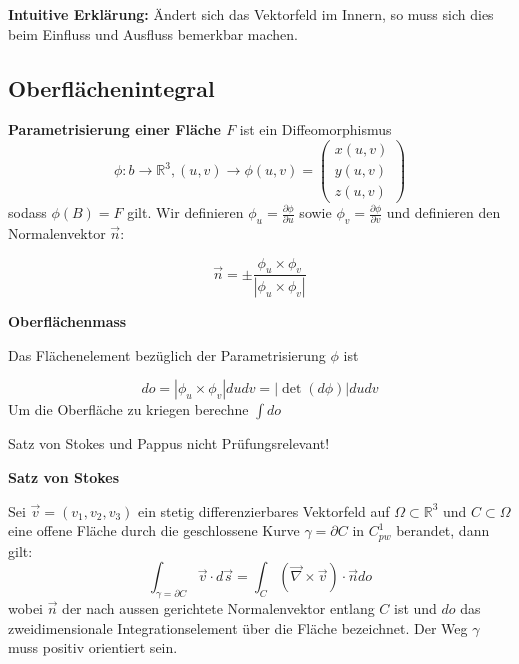\documentclass[25pt]{sciposter}
\newcommand{\R}{\mathbb{R}}
\newenvironment{method}[1]{\begin{mdframed}[backgroundcolor=blue!10,innertopmargin=15pt, innerbottommargin=15pt, nobreak=true]
		\textbf{#1 }
	}
	{ 
	\end{mdframed}
}
\newenvironment{important}{\begin{mdframed}[backgroundcolor=red!50,innertopmargin=15pt, innerbottommargin=15pt, nobreak=true]
		\Large
	}
	{ 
	\end{mdframed}
}
\begin{document}
\begin{multicols}{3}
\textbf{Intuitive Erklärung: } Ändert sich das Vektorfeld im Innern, so muss sich dies beim Einfluss und Ausfluss bemerkbar machen.


\subsection*{Oberflächenintegral}
\textbf{Parametrisierung einer Fläche $F$} ist ein Diffeomorphismus $$\phi:b \to \R^3, (u,v)\to\phi(u,v) = \begin{pmatrix}
x(u,v)\\y(u,v)\\z(u,v)
\end{pmatrix}$$ sodass $\phi(B) = F$ gilt. Wir definieren $\phi_u = \frac{\partial \phi}{\partial u}$ sowie 
$\phi_v = \frac{\partial \phi}{\partial v}$ und definieren den Normalenvektor $\vec{n}$:

$$\vec{n} = \pm \frac{\phi_u \times \phi_v}{|\phi_u \times \phi_v|}$$

\begin{method}{Oberflächenmass}
Das Flächenelement bezüglich der Parametrisierung $\phi$ ist 

$$do = |\phi_u \times \phi_v|dudv = |\operatorname{det}(d\phi)|dudv$$ Um die Oberfläche zu kriegen berechne $\int do$	
\end{method}

\ifx

\begin{important}
	Satz von Stokes und Pappus nicht Prüfungsrelevant!
\end{important}

\begin{method}{Satz von Stokes}
	Sei $\vec{v} = (v_1,v_2,v_3)$ ein stetig differenzierbares Vektorfeld auf $\Omega\subset \R^3$ und $C\subset \Omega$ eine offene Fläche durch die geschlossene Kurve $\gamma = \partial C$ in $C_{pw}^1$ berandet, dann gilt:
	$$\int_{\gamma = \partial C} \vec{v}\cdot d\vec{s} = \int_{C} (\vec{\nabla}\times \vec{v}) \cdot\vec{n} do$$ wobei $\vec{n}$ der nach aussen gerichtete Normalenvektor entlang $C$ ist und $do$ das zweidimensionale Integrationselement über die Fläche bezeichnet. Der Weg $\gamma$ muss positiv orientiert sein.
\end{method}

\fi













\end{multicols}
\end{document}
